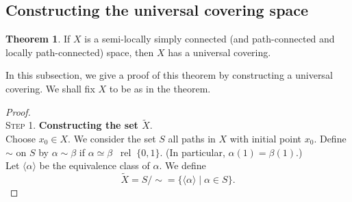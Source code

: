 \documentclass[12pt]{article}
\theoremstyle{definition}
\newtheorem{thm}{Theorem}
\numberwithin{thm}{section}
\newcommand{\rel}{\;\;\operatorname{rel}\;}
\begin{document}
\subsection{Constructing the universal covering space}
\begin{thm}
	If $X$ is a semi-locally simply connected (and path-connected and locally path-connected) space, then $X$ has a universal covering.
\end{thm}
In this subsection, we give a proof of this theorem by constructing a universal covering. We shall fix $X$ to be as in the theorem.\\
%
%
\begin{proof} \phantom{hi}\\
\textsc{Step 1.} \textbf{Constructing the set $\tilde{X}.$}\\
Choose $x_0 \in X.$ We consider the set $S$ all paths in $X$ with initial point $x_0.$ Define $\sim$ on $S$ by $\alpha \sim \beta$ if $\alpha\simeq\beta\rel\{0, 1\}.$ (In particular, $\alpha(1) = \beta(1).$)\\
Let $\langle \alpha\rangle$ be the equivalence class of $\alpha.$ We define
\begin{equation*} 
	\tilde{X} = S/{\sim} = \{\langle \alpha\rangle \mid \alpha \in S\}.
\end{equation*}

\dotfill


\end{proof}
\end{document}
